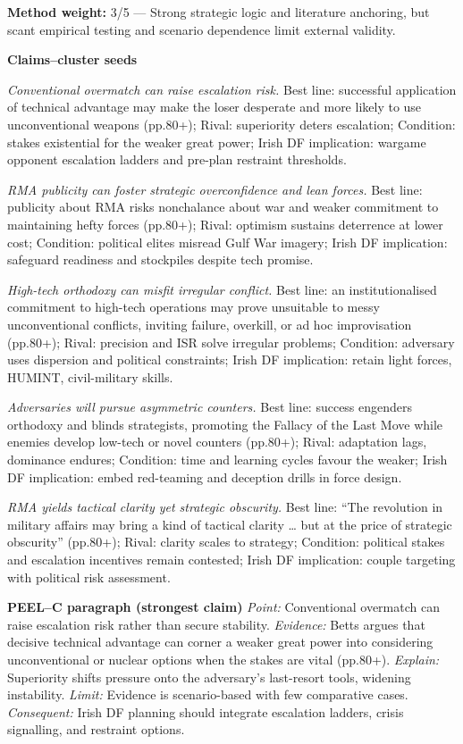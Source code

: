 \textbf{Method weight:} 3/5 — Strong strategic logic and literature anchoring, but scant empirical testing and scenario dependence limit external validity.

\textbf{Claims–cluster seeds}

\textit{Conventional overmatch can raise escalation risk.} Best line: successful application of technical advantage may make the loser desperate and more likely to use unconventional weapons (pp.80+); Rival: superiority deters escalation; Condition: stakes existential for the weaker great power; Irish DF implication: wargame opponent escalation ladders and pre-plan restraint thresholds.

\textit{RMA publicity can foster strategic overconfidence and lean forces.} Best line: publicity about RMA risks nonchalance about war and weaker commitment to maintaining hefty forces (pp.80+); Rival: optimism sustains deterrence at lower cost; Condition: political elites misread Gulf War imagery; Irish DF implication: safeguard readiness and stockpiles despite tech promise.

\textit{High-tech orthodoxy can misfit irregular conflict.} Best line: an institutionalised commitment to high-tech operations may prove unsuitable to messy unconventional conflicts, inviting failure, overkill, or ad hoc improvisation (pp.80+); Rival: precision and ISR solve irregular problems; Condition: adversary uses dispersion and political constraints; Irish DF implication: retain light forces, HUMINT, civil-military skills.

\textit{Adversaries will pursue asymmetric counters.} Best line: success engenders orthodoxy and blinds strategists, promoting the Fallacy of the Last Move while enemies develop low-tech or novel counters (pp.80+); Rival: adaptation lags, dominance endures; Condition: time and learning cycles favour the weaker; Irish DF implication: embed red-teaming and deception drills in force design.

\textit{RMA yields tactical clarity yet strategic obscurity.} Best line: “The revolution in military affairs may bring a kind of tactical clarity … but at the price of strategic obscurity” (pp.80+); Rival: clarity scales to strategy; Condition: political stakes and escalation incentives remain contested; Irish DF implication: couple targeting with political risk assessment.

\textbf{PEEL–C paragraph (strongest claim)}
\textit{Point:} Conventional overmatch can raise escalation risk rather than secure stability.
\textit{Evidence:} Betts argues that decisive technical advantage can corner a weaker great power into considering unconventional or nuclear options when the stakes are vital (pp.80+).
\textit{Explain:} Superiority shifts pressure onto the adversary’s last-resort tools, widening instability.
\textit{Limit:} Evidence is scenario-based with few comparative cases.
\textit{Consequent:} Irish DF planning should integrate escalation ladders, crisis signalling, and restraint options.

